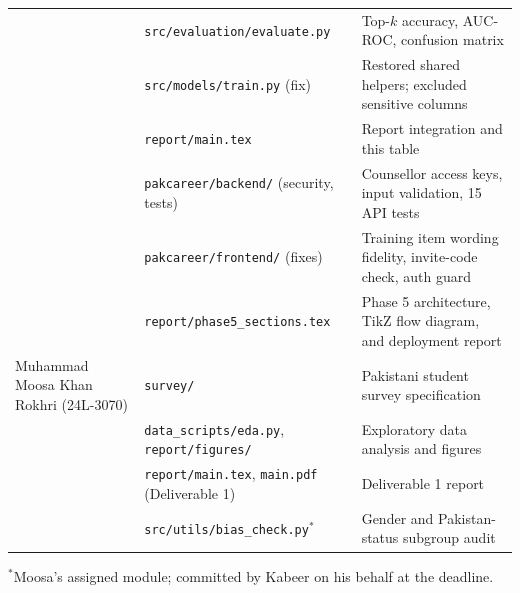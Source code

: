 \begin{table}[h]
\begin{tabular}{p{3.4cm}p{5.4cm}p{6.2cm}}
  & \texttt{src/evaluation/evaluate.py} & Top-$k$ accuracy, AUC-ROC, confusion matrix \\
  & \texttt{src/models/train.py} (fix) & Restored shared helpers; excluded sensitive columns \\
  & \texttt{report/main.tex} & Report integration and this table \\
  & \texttt{pakcareer/backend/} (security, tests) & Counsellor access keys, input validation, 15 API tests \\
  & \texttt{pakcareer/frontend/} (fixes) & Training item wording fidelity, invite-code check, auth guard \\
  & \texttt{report/phase5\_sections.tex} & Phase 5 architecture, TikZ flow diagram, and deployment report \\
\midrule
Muhammad Moosa Khan Rokhri (24L-3070)
  & \texttt{survey/} & Pakistani student survey specification \\
  & \texttt{data\_scripts/eda.py}, \texttt{report/figures/} & Exploratory data analysis and figures \\
  & \texttt{report/main.tex}, \texttt{main.pdf} (Deliverable 1) & Deliverable 1 report \\
  & \texttt{src/utils/bias\_check.py}$^{*}$ & Gender and Pakistan-status subgroup audit \\
\bottomrule
\end{tabular}

\smallskip
\footnotesize $^{*}$Moosa's assigned module; committed by Kabeer on his behalf at the deadline.
\end{table}
